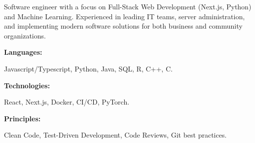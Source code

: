 \documentclass[9pt]{developercv} %
\begin{document}
\begin{minipage}[t]{0.46\textwidth}
	\vspace{-6pt}


	Software engineer with a focus on Full-Stack Web Development (Next.js, Python) and Machine Learning. Experienced in leading IT teams, server administration, and implementing modern software solutions for both business and community organizations.
\end{minipage}
\hfill %
\begin{minipage}[t]{0.465\textwidth}
	\vspace{-6pt}

	\begin{minipage}[t]{0.28\textwidth}
		\textbf{Languages:}
	\end{minipage}
	\hfill
	\begin{minipage}[t]{0.71\textwidth}
		Javascript/Typescript, Python, Java, SQL, R, C++, C.
	\end{minipage}
	\vspace{3mm}

	\begin{minipage}[t]{0.28\textwidth}
		\textbf{Technologies:}
	\end{minipage}
	\hfill
	\begin{minipage}[t]{0.71\textwidth}
		React, Next.js, Docker, CI/CD, PyTorch.
	\end{minipage}
	\vspace{-1mm}

	\begin{minipage}[t]{0.28\textwidth}
		\textbf{Principles:}
	\end{minipage}
	\hfill
	\begin{minipage}[t]{0.71\textwidth}
		Clean Code, Test-Driven Development, Code Reviews, Git best practices.
	\end{minipage}

\end{minipage}
\end{document}
